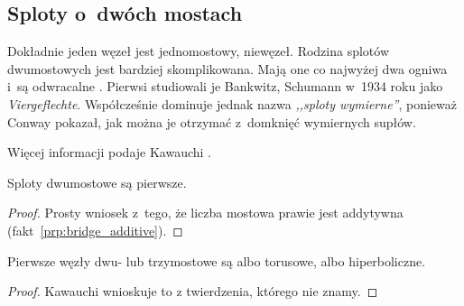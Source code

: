 
\subsection{Sploty o~dwóch mostach}
\label{sub:twobridge}%
%
%
Dokładnie jeden węzeł jest jednomostowy, niewęzeł.
Rodzina splotów dwumostowych jest bardziej skomplikowana.
Mają one co najwyżej dwa ogniwa i~są odwracalne \cite[s. 211]{burde2014}.
Pierwsi studiowali je Bankwitz, Schumann \cite{bankwitz1934} w~1934 roku jako \emph{Viergeflechte}.
Współcześnie dominuje jednak nazwa \emph{,,sploty wymierne''}, ponieważ Conway pokazał, jak można je otrzymać z~domknięć wymiernych supłów.

Więcej informacji podaje Kawauchi \cite[s. 21-26]{kawauchi1996}.

\begin{proposition}
    Sploty dwumostowe są pierwsze.
\end{proposition}

\begin{proof}
    Prosty wniosek z~tego, że liczba mostowa prawie jest addytywna (fakt~\ref{prp:bridge_additive}).
\end{proof}

\begin{corollary}
    Pierwsze węzły dwu- lub trzymostowe są albo torusowe, albo hiperboliczne.
\end{corollary}

\begin{proof}
    Kawauchi \cite[s. 130]{kawauchi1996} wnioskuje to z twierdzenia, którego nie znamy.
\end{proof}


